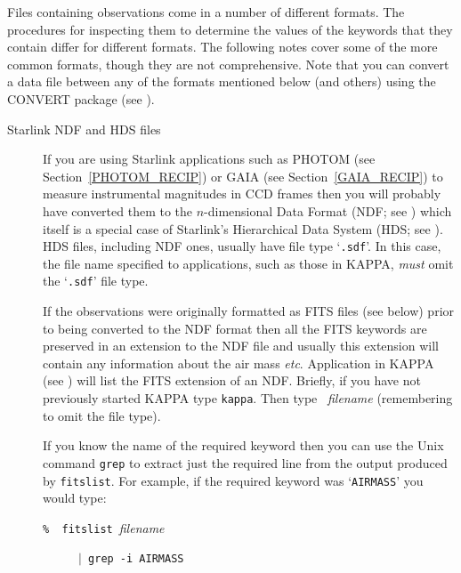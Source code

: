 \documentclass[twoside,11pt,nolof]{starlink}
\begin{document}
Files containing observations come in a number of different formats.
The procedures for inspecting them to determine the values of the
keywords that they contain differ for different formats.  The following
notes cover some of the more common formats, though they are not
comprehensive.  Note that you can convert a data file between any of
the formats mentioned below (and others) using the CONVERT package
(see \cite{SUN55}).

\begin{description}

  \item[Starlink NDF and HDS files] If you are using Starlink
   applications such as PHOTOM (see Section~\ref{PHOTOM_RECIP}) or
   GAIA (see Section~\ref{GAIA_RECIP}) to measure instrumental
   magnitudes in CCD frames then you will probably have converted them
   to the $n$-dimensional Data Format (NDF; see
   \cite{SUN33}) which itself is a special case
   of Starlink's Hierarchical Data System (HDS; see
   \cite{SUN92}).  HDS files, including NDF
   ones, usually have file type `\texttt{.sdf}'.  In this case, the file name
   specified to applications, such as those in KAPPA, \textit{must\/} omit
   the `\texttt{.sdf}' file type.

   If the observations were originally formatted as FITS files (see
   below) prior to being converted to the NDF format then all the
   FITS keywords are preserved in an extension to the NDF file and
   usually this extension will contain any information about the
   air mass \emph{etc}.  Application 
   in KAPPA (see \cite{SUN95}) will list the FITS
   extension of an NDF.  Briefly, if you have not previously started
   KAPPA type \texttt{kappa}.  Then type
   ~\textit{filename}
   (remembering to omit the file type).

   If you know the name of the required keyword then you can use the
   Unix command \texttt{grep} to extract just the required line from the
   output produced by \texttt{fitslist}.  For example, if the required keyword
   was `\texttt{AIRMASS}' you would type:

  \begin{description}

    \item[\texttt{\% ~fitslist}~\textit{filename\/}] \texttt{$|$ grep -i AIRMASS}


\end{description}
\end{description}
\end{document}
